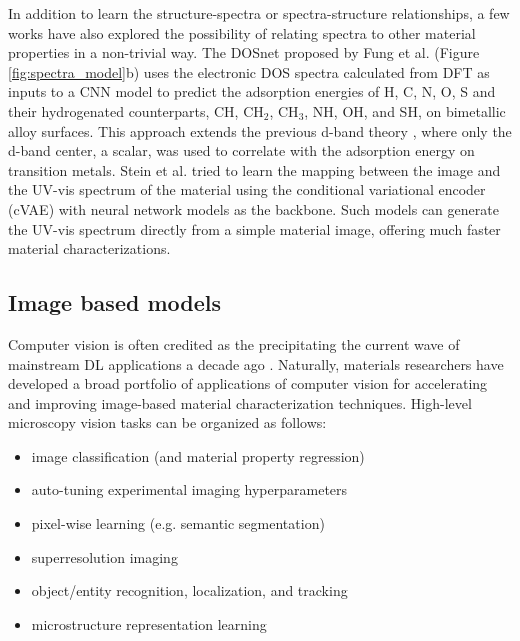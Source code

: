 \documentclass[pdflatex,sn-mathphys]{sn-jnl}%
\theoremstyle{thmstyleone}%
\theoremstyle{thmstyletwo}%
\theoremstyle{thmstylethree}%
\begin{document}
In addition to learn the structure-spectra or spectra-structure relationships, a few works have also explored the possibility of relating spectra to other material properties in a non-trivial way. The DOSnet proposed by Fung et al. \cite{fungMachineLearnedFeatures2021} (Figure \ref{fig:spectra_model}b) uses the electronic DOS spectra calculated from DFT as inputs to a CNN model to predict the adsorption energies of H, C, N, O, S and their hydrogenated counterparts, CH, CH$_2$, CH$_3$, NH, OH, and SH,  on bimetallic alloy surfaces. This approach extends the previous d-band theory  \cite{hammer_norskov_2000}, where only the d-band center, a scalar, was used to correlate with the adsorption energy on transition metals. Stein et al.   \cite{stein_soedarmadji_newhouse_guevarra_gregoire_2019} tried to learn the mapping between the image and the UV-vis spectrum of the material using the conditional variational encoder (cVAE) with neural network models as the backbone. Such models can generate the UV-vis spectrum directly from a simple material image, offering much faster material characterizations.

\subsection{Image based models}\label{sec:image}
Computer vision is often credited as the precipitating the current wave of mainstream DL applications a decade ago \cite{krizhevsky2012imagenet}.
Naturally, materials researchers have developed a broad portfolio of applications of computer vision for accelerating and improving image-based material characterization techniques. 
High-level microscopy vision tasks can be organized as follows:
\begin{itemize}
    \item image classification (and material property regression)
    \item auto-tuning experimental imaging hyperparameters
    \item pixel-wise learning (e.g. semantic segmentation)
    \item superresolution imaging
    \item object/entity recognition, localization, and tracking
    \item microstructure representation learning 
\end{itemize}

\end{document}
